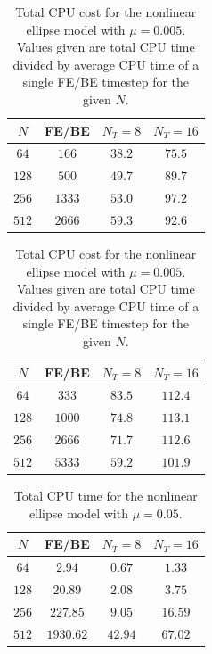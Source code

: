 \begin{table}
\caption{Total CPU cost for the nonlinear ellipse model with $\mu=0.05$. Values given are total CPU time divided by average CPU time of a single FE/BE timestep for the given $N$.}
\label{table:NonlinearEllipseSims_05Fluids}
\begin{center}
\begin{tabular}{|c|c| c c|}
\hline
$N$ & FE/BE & $N_T = 8$ & $N_T = 16$\\
\hline
$64$ & $166$ & $38.2$ & $75.5$ \\
$128$ & $500$ & $49.7$ & $89.7$ \\
$256$ & $1333$ & $53.0$ & $97.2$ \\
$512$ & $2666$ & $59.3$ & $92.6$ \\
\hline
\end{tabular}
\end{center}

\caption{Total CPU cost for the nonlinear ellipse model with $\mu=0.005$. Values given are total CPU time divided by average CPU time of a single FE/BE timestep for the given $N$.}
\label{table:NonlinearEllipseSims_005Fluids}
\begin{center}
\begin{tabular}{|c|c| c c|}
\hline
$N$ & FE/BE & $N_T = 8$ & $N_T = 16$\\
\hline
$64$ & $333$ & $83.5$ & $112.4$ \\
$128$ & $1000$ & $74.8$ & $113.1$ \\
$256$ & $2666$ & $71.7$ & $112.6$ \\
$512$ & $5333$ & $59.2$ & $101.9$ \\
\hline
\end{tabular}
\end{center}
\end{table}

\begin{table}
\caption{Total CPU time for the nonlinear ellipse model with $\mu=0.05$.}
\label{table:NonlinearEllipseSims_05CPU}
\begin{center}
\begin{tabular}{|c|c| c c|}
\hline
$N$ & FE/BE & $N_T = 8$ & $N_T = 16$\\
\hline
$64$ & $2.94$ & $0.67$ & $1.33$ \\
$128$ & $20.89$ & $2.08$ & $3.75$ \\
$256$ & $227.85$ & $9.05$ & $16.59$ \\
$512$ & $1930.62$ & $42.94$ & $67.02$ \\
\hline
\end{tabular}
\end{center}
\end{table}

